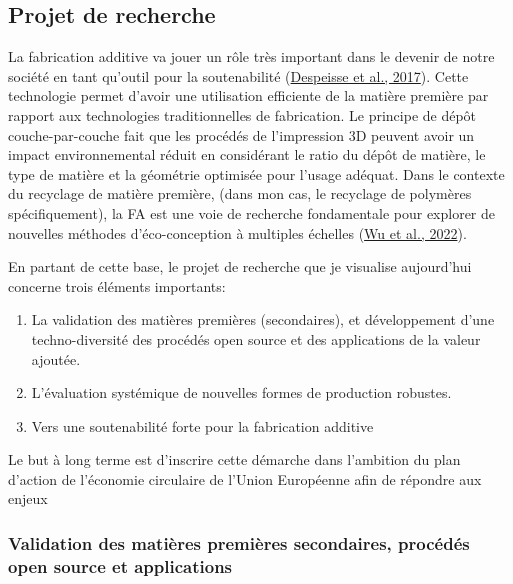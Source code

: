 \documentclass[
  11pt,
]{article}
\providecommand{\tightlist}{%
  \setlength{\itemsep}{0pt}\setlength{\parskip}{0pt}}\usepackage{longtable,booktabs,array}
\begin{document}
\hypertarget{projet-de-recherche}{%
\subsection{Projet de recherche}\label{projet-de-recherche}}

La fabrication additive va jouer un rôle très important dans le devenir
de notre société en tant qu'outil pour la soutenabilité
(\protect\hyperlink{ref-Despeisse2016}{Despeisse et al., 2017}). Cette
technologie permet d'avoir une utilisation efficiente de la matière
première par rapport aux technologies traditionnelles de fabrication. Le
principe de dépôt couche-par-couche fait que les procédés de
l'impression 3D peuvent avoir un impact environnemental réduit en
considérant le ratio du dépôt de matière, le type de matière et la
géométrie optimisée pour l'usage adéquat. Dans le contexte du recyclage
de matière première, (dans mon cas, le recyclage de polymères
spécifiquement), la FA est une voie de recherche fondamentale pour
explorer de nouvelles méthodes d'éco-conception à multiples échelles
(\protect\hyperlink{ref-Wu2021a}{Wu et al., 2022}).

En partant de cette base, le projet de recherche que je visualise
aujourd'hui concerne trois éléments importants:

\begin{enumerate}
\def\labelenumi{\arabic{enumi}.}
\tightlist
\item
  La validation des matières premières (secondaires), et développement
  d'une techno-diversité des procédés open source et des applications de
  la valeur ajoutée.
\item
  L'évaluation systémique de nouvelles formes de production robustes.
\item
  Vers une soutenabilité forte pour la fabrication additive
\end{enumerate}

Le but à long terme est d'inscrire cette démarche dans l'ambition du
plan d'action de l'économie circulaire de l'Union Européenne afin de
répondre aux enjeux

\hypertarget{validation-des-matiuxe8res-premiuxe8res-secondaires-procuxe9duxe9s-open-source-et-applications}{%
\subsubsection{Validation des matières premières secondaires, procédés
open source et
applications}\label{validation-des-matiuxe8res-premiuxe8res-secondaires-procuxe9duxe9s-open-source-et-applications}}
\end{document}
